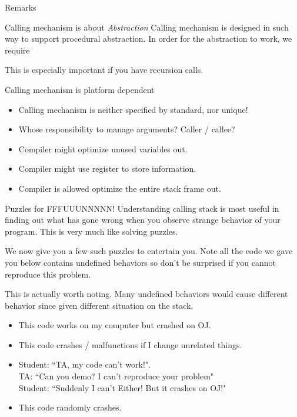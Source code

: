 \begin{frame}{Remarks}
\begin{block}{Calling mechanism is about \textit{Abstraction}}
	Calling mechanism is designed in such way to support procedural abstraction. In order for the abstraction to work, we require
	\begin{center}
	\end{center}
	This is especially important if you have recursion calls.
\end{block}

\begin{block}{Calling mechanism is platform dependent}
	\begin{itemize}
		\item Calling mechanism is neither specified by standard, nor unique!
		\item Whose responsibility to manage arguments? Caller / callee?
		\item Compiler might optimize unused variables out.
		\item Compiler might use register to store information.
		\item Compiler is allowed optimize the entire stack frame out.
	\end{itemize}
\end{block}
\end{frame}

\begin{frame}{Puzzles for \alert{FFFUUUNNNNN}!}
Understanding calling stack is most useful in finding out what has gone wrong when you observe strange behavior of your program. This is very much like solving puzzles.

We now give you a few such puzzles to entertain you. Note all the code we gave you below contains \alert{undefined behaviors} so don't be surprised if you cannot reproduce this problem.

This is actually worth noting. Many undefined behaviors would cause different behavior since given different situation on the stack. 

\begin{itemize}
	\item This code works on my computer but crashed on OJ.
	\item This code crashes / malfunctions if I change unrelated things.
	\item Student: ``TA, my code can't work!". \\
	      TA\qquad: ``Can you demo? I can't reproduce your problem"\\
	      Student: ``Suddenly I can't Either! But it crashes on OJ!"
	\item This code randomly crashes.
\end{itemize} 
\end{frame}


